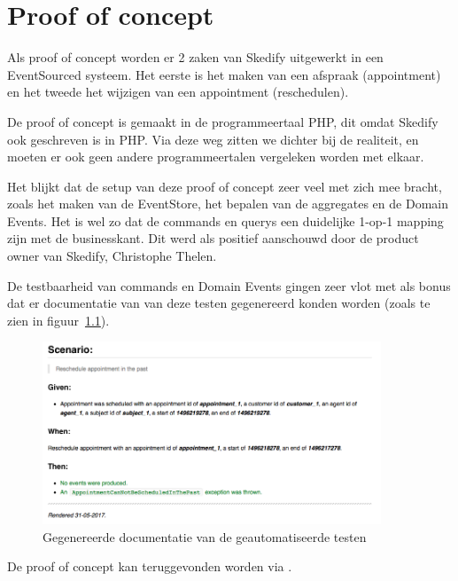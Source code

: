 
\chapter{Proof of concept}
\label{ch:POC}

Als proof of concept worden er 2 zaken van Skedify uitgewerkt in een EventSourced systeem. Het eerste is het maken van een afspraak (appointment) en het tweede het wijzigen van een appointment (reschedulen).

De proof of concept is gemaakt in de programmeertaal PHP, dit omdat Skedify ook geschreven is in PHP. Via deze weg zitten we dichter bij de realiteit, en moeten er ook geen andere programmeertalen vergeleken worden met elkaar.

Het blijkt dat de setup van deze proof of concept zeer veel met zich mee bracht, zoals het maken van de EventStore, het bepalen van de aggregates en de Domain Events. Het is wel zo dat de \Glspl{command} en \Glspl{query} een duidelijke 1-op-1 mapping zijn met de businesskant. Dit werd als positief aanschouwd door de product owner van Skedify, Christophe Thelen.

De testbaarheid van \Glspl{command} en Domain Events gingen zeer vlot met als bonus dat er documentatie van van deze testen gegenereerd konden worden (zoals te zien in figuur~\ref{fig:documentation}).

\begin{figure}[h]
\caption{Gegenereerde documentatie van de geautomatiseerde testen} \label{fig:documentation}
\centering
\includegraphics[width=0.9\textwidth]{img/documentatie-voorbeeld}
\end{figure}

De proof of concept kan teruggevonden worden via \textcite{malfait2017poc}.